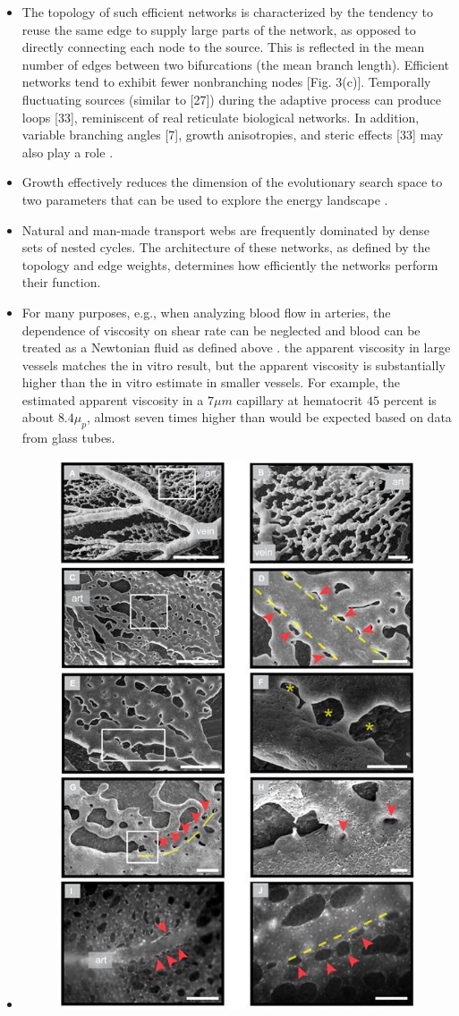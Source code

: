 \begin{itemize}
	\item The topology of such efficient networks is characterized by the tendency to reuse the same edge to supply large parts of the network, as opposed to directly connecting each node to the source. This is reflected in the mean number of edges between two bifurcations (the mean branch length). Efficient networks tend to exhibit fewer nonbranching nodes [Fig. 3(c)]. Temporally fluctuating sources (similar to [27]) during the adaptive process can produce loops [33], reminiscent of real reticulate biological networks. In addition, variable branching angles [7], growth anisotropies, and steric effects [33] may also play a role \cite{Ronellenfitsch2016}.
	\item Growth effectively reduces the dimension of the evolutionary search space to two parameters that can be used to explore the energy landscape \cite{Ronellenfitsch2016}.
	\item Natural and man-made transport webs are frequently dominated by dense sets of nested cycles. The architecture of these networks, as defined by the topology and edge weights, determines how efficiently the networks perform their function. \cite{Modes2016}
	\item For many purposes, e.g., when analyzing blood flow in arteries, the dependence of viscosity on shear rate can be neglected and blood can be treated as a Newtonian fluid as defined above \cite{Secomb2021}.
	 the apparent viscosity in large vessels matches the in vitro result, but the apparent viscosity is substantially higher than the in vitro estimate in smaller vessels. For example, the estimated apparent viscosity in a $7\mu m$ capillary at hematocrit $45$ percent is about $8.4\mu_p$, almost seven times higher than would be expected based on data from glass tubes.
	\item 
	\begin{figure}
		\centering
		\includegraphics[width=0.5\linewidth]{images/pillarFormationInEmbryoLigation}

\end{figure}
\end{itemize}
